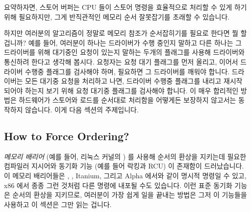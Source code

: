 요약하자면, 스토어 버퍼는 CPU 들이 스토어 명령을 효율적으로 처리할 수 있게 하기
위해 필요하지만, 그게 반직관적인 메모리 순서 잘못잡기를 초래할 수 있습니다.

하지만 여러분의 알고리즘이 정말로 메모리 참조가 순서잡히기를 필요로 한다면 뭘
할겁니까?
예를 들어, 여러분이 하나는 드라이버가 수행 중인지 말하고 다른 하나는 그
드라이버를 위해 대기중인 요청이 있는지 말하는 두개의 플래그를 사용해 드라이버와
통신하려 한다고 생각해 봅시다.
요청자는 요청 대기 플래그를 먼저 올리고, 이어서 드라이버 수행중 플래그를
검사해야 하며, 필요하면 그 드라이버를 깨워야 합니다.
드라이버는 모든 대기중 요청을 처리하고 나면, 드라이버 수행중 플래그를 내리고
재시작 되어야 하는지 보기 위해 요청 대기중 플래그를 검사해야 합니다.
이 매우 합리적인 방법은 하드웨어가 스토어와 로드를 순서대로 처리함을 어떻게든
보장하지 않고서는 동작하지 않습니다.
이게 다음 섹션의 주제입니다.

\subsection{How to Force Ordering?}
\label{sec:memorder:How to Force Ordering?}

\emph{메모리 배리어} (예를 들어, 리눅스 커널의 ) 를 사용해 순서의
환상을 지키는데 필요한 컴파일러 지시어와 동기화 기능 (예를 들어 락킹과 RCU) 이
존재함이 드러났습니다.
이 메모리 배리어들은
\ARM, \Power{}, Itanium, 그리고 Alpha 에서와 같이 명시적 명령일 수 있고, x86
에서 종종 그런 것처럼 다른 명령에 내포될 수도 있습니다.
이런 표준 동기화 기능은 순서의 환상을 지키므로, 여러분이 가장 쉽게 일을 끝내는
방법은 그저 이 기능들을 사용하고 이 섹션은 그만 읽는 겁니다.

